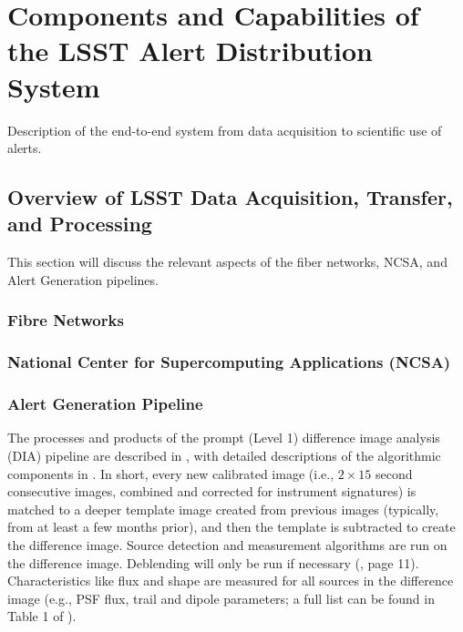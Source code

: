 \section{Components and Capabilities of the LSST Alert Distribution System}\label{sec:components}

Description of the end-to-end system from data acquisition to scientific use of alerts.

\subsection{Overview of LSST Data Acquisition, Transfer, and Processing}

This section will discuss the relevant aspects of the fiber networks, NCSA, and Alert Generation pipelines.

\subsubsection{Fibre Networks}

\subsubsection{National Center for Supercomputing Applications (NCSA)}

\subsubsection{Alert Generation Pipeline}

The processes and products of the prompt (Level 1) difference image analysis (DIA) pipeline are described in , with detailed descriptions of the algorithmic components in . In short, every new calibrated image (i.e., $2\times15$ second consecutive images, combined and corrected for instrument signatures) is matched to a deeper template image created from previous images (typically, from at least a few months prior), and then the template is subtracted to create the difference image. Source detection and measurement algorithms are run on the difference image. Deblending will only be run if necessary (, page 11). Characteristics like flux and shape are measured for all sources in the difference image (e.g., PSF flux, trail and dipole parameters; a full list can be found in Table 1 of ). 

